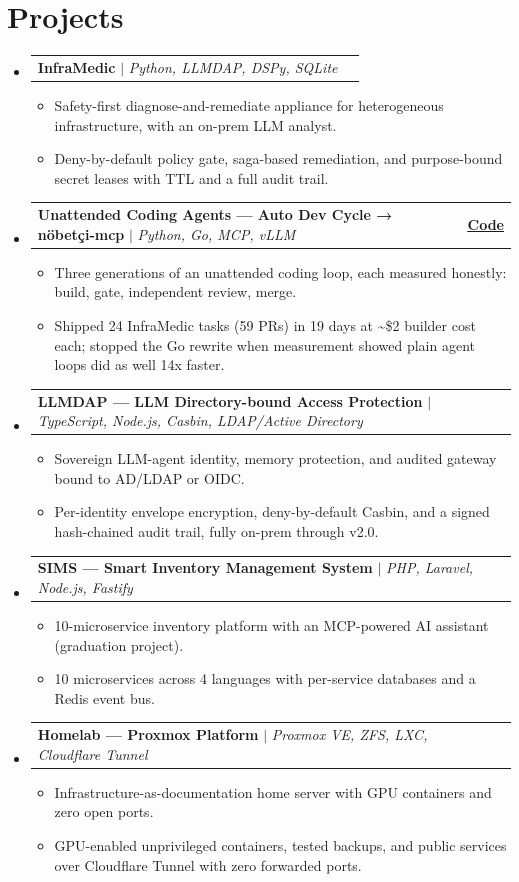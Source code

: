 \documentclass[letterpaper,10pt]{article}
\makeatletter
\newcommand{\resumeItem}[1]{\item\small{{#1 \vspace{-3pt}}}}
\newcommand{\resumeProjectHeading}[2]{\item
  \begin{tabular*}{1.0\textwidth}{l@{\extracolsep{\fill}}r}
    \small#1 & \textbf{\small #2}\\
  \end{tabular*}\vspace{-6pt}}
\newcommand{\resumeSubHeadingListStart}{\begin{itemize}[leftmargin=0.0in, label={}]}
\newcommand{\resumeSubHeadingListEnd}{\end{itemize}}
\newcommand{\resumeItemListStart}{\begin{itemize}[leftmargin=0.15in, label={\textbullet}]}
\newcommand{\resumeItemListEnd}{\end{itemize}\vspace{1pt}}
\makeatother
\begin{document}
\section{Projects}
\resumeSubHeadingListStart
\resumeProjectHeading{\textbf{InfraMedic} $|$ \emph{Python, LLMDAP, DSPy, SQLite}}{}
\resumeItemListStart
\resumeItem{Safety-first diagnose-and-remediate appliance for heterogeneous infrastructure, with an on-prem LLM analyst.}
\resumeItem{Deny-by-default policy gate, saga-based remediation, and purpose-bound secret leases with TTL and a full audit trail.}
\resumeItemListEnd
\resumeProjectHeading{\textbf{Unattended Coding Agents — Auto Dev Cycle → nöbetçi-mcp} $|$ \emph{Python, Go, MCP, vLLM}}{\href{https://github.com/ekaynac/auto-dev-cycle}{\underline{Code}}}
\resumeItemListStart
\resumeItem{Three generations of an unattended coding loop, each measured honestly: build, gate, independent review, merge.}
\resumeItem{Shipped 24 InfraMedic tasks (59 PRs) in 19 days at \textasciitilde{}\$2 builder cost each; stopped the Go rewrite when measurement showed plain agent loops did as well 14x faster.}
\resumeItemListEnd
\resumeProjectHeading{\textbf{LLMDAP — LLM Directory-bound Access Protection} $|$ \emph{TypeScript, Node.js, Casbin, LDAP/Active Directory}}{}
\resumeItemListStart
\resumeItem{Sovereign LLM-agent identity, memory protection, and audited gateway bound to AD/LDAP or OIDC.}
\resumeItem{Per-identity envelope encryption, deny-by-default Casbin, and a signed hash-chained audit trail, fully on-prem through v2.0.}
\resumeItemListEnd
\resumeProjectHeading{\textbf{SIMS — Smart Inventory Management System} $|$ \emph{PHP, Laravel, Node.js, Fastify}}{}
\resumeItemListStart
\resumeItem{10-microservice inventory platform with an MCP-powered AI assistant (graduation project).}
\resumeItem{10 microservices across 4 languages with per-service databases and a Redis event bus.}
\resumeItemListEnd
\resumeProjectHeading{\textbf{Homelab — Proxmox Platform} $|$ \emph{Proxmox VE, ZFS, LXC, Cloudflare Tunnel}}{}
\resumeItemListStart
\resumeItem{Infrastructure-as-documentation home server with GPU containers and zero open ports.}
\resumeItem{GPU-enabled unprivileged containers, tested backups, and public services over Cloudflare Tunnel with zero forwarded ports.}
\resumeItemListEnd
\resumeSubHeadingListEnd
\vspace{-7pt}
\end{document}
